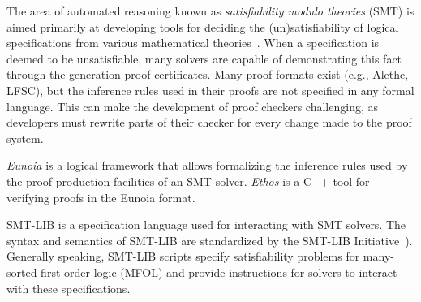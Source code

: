 \documentclass[class=llncs, crop=false]{standalone}
\begin{document}
%
The area of automated reasoning known as
\emph{satisfiability modulo theories} (SMT) is aimed
primarily at developing tools for deciding the
(un)satisfiability of logical specifications from various
mathematical theories~\cite{Barrett2021}.
%
When a specification is deemed to be unsatisfiable,
many solvers are capable of demonstrating this fact through
the generation proof certificates.
%
Many proof formats exist (e.g., Alethe, LFSC), but the
inference rules used in their proofs are not specified in
any formal language.
%
This can make the development of proof checkers challenging,
as developers must rewrite parts of their checker for every
change made to the proof system.

\textit{Eunoia} is a logical framework that allows formalizing
the inference rules used by the proof production facilities
of an SMT solver.
%
\textit{Ethos} is a C++ tool for verifying proofs in the
Eunoia format.

SMT-LIB is a specification language used for interacting
with SMT solvers. The syntax and semantics of SMT-LIB are
standardized by the
SMT-LIB Initiative~\autocite{Barrett2015-standard}).
%
Generally speaking, SMT-LIB scripts specify satisfiability
problems for many-sorted first-order logic (MFOL) and
provide instructions for solvers to interact with these
specifications.
%
\end{document}
